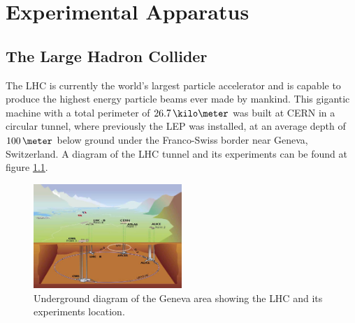 \chapter{Experimental Apparatus}
\label{CHAPTER:ExperimentalApparatus}

\section{The Large Hadron Collider}
\label{SECTION:ExperimentalApparatus_LHC}

%

%  

The \gls{LHC}\cite{ARTICLE:LHC Machine} is currently the world's largest particle accelerator and is capable to produce the highest energy particle beams ever made by mankind. This gigantic machine with a total perimeter of $26.7\,\kilo\meter$ was built at \gls{CERN} in a circular tunnel, where previously the \gls{LEP}\cite{LEPTDR:LEPInjectorStudyGroup} was installed, at an average depth of $100\,\meter$ below ground under the Franco-Swiss border near Geneva, Switzerland. A diagram of the \gls{LHC} tunnel and its experiments can be found at figure \ref{FIGURE:ExperimentalApparatus_LHCLayoutUnderground}.

\begin{figure}[!htb]
  \centering
  \includegraphics[width=0.50\textwidth]{Chapter02/LHC/Images/LHC_layout_underground.jpg}
  \caption{Underground diagram of the Geneva area showing the \gls{LHC} and its experiments location.}
  \label{FIGURE:ExperimentalApparatus_LHCLayoutUnderground}
\end{figure}

